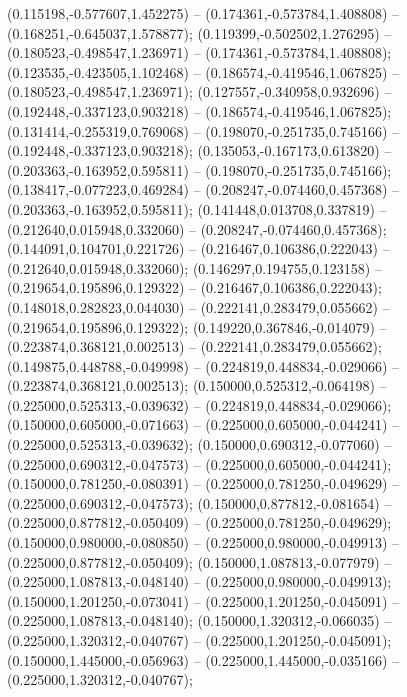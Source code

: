  (0.115198,-0.577607,1.452275) -- (0.174361,-0.573784,1.408808) -- (0.168251,-0.645037,1.578877);
 (0.119399,-0.502502,1.276295) -- (0.180523,-0.498547,1.236971) -- (0.174361,-0.573784,1.408808);
 (0.123535,-0.423505,1.102468) -- (0.186574,-0.419546,1.067825) -- (0.180523,-0.498547,1.236971);
 (0.127557,-0.340958,0.932696) -- (0.192448,-0.337123,0.903218) -- (0.186574,-0.419546,1.067825);
 (0.131414,-0.255319,0.769068) -- (0.198070,-0.251735,0.745166) -- (0.192448,-0.337123,0.903218);
 (0.135053,-0.167173,0.613820) -- (0.203363,-0.163952,0.595811) -- (0.198070,-0.251735,0.745166);
 (0.138417,-0.077223,0.469284) -- (0.208247,-0.074460,0.457368) -- (0.203363,-0.163952,0.595811);
 (0.141448,0.013708,0.337819) -- (0.212640,0.015948,0.332060) -- (0.208247,-0.074460,0.457368);
 (0.144091,0.104701,0.221726) -- (0.216467,0.106386,0.222043) -- (0.212640,0.015948,0.332060);
 (0.146297,0.194755,0.123158) -- (0.219654,0.195896,0.129322) -- (0.216467,0.106386,0.222043);
 (0.148018,0.282823,0.044030) -- (0.222141,0.283479,0.055662) -- (0.219654,0.195896,0.129322);
 (0.149220,0.367846,-0.014079) -- (0.223874,0.368121,0.002513) -- (0.222141,0.283479,0.055662);
 (0.149875,0.448788,-0.049998) -- (0.224819,0.448834,-0.029066) -- (0.223874,0.368121,0.002513);
 (0.150000,0.525312,-0.064198) -- (0.225000,0.525313,-0.039632) -- (0.224819,0.448834,-0.029066);
 (0.150000,0.605000,-0.071663) -- (0.225000,0.605000,-0.044241) -- (0.225000,0.525313,-0.039632);
 (0.150000,0.690312,-0.077060) -- (0.225000,0.690312,-0.047573) -- (0.225000,0.605000,-0.044241);
 (0.150000,0.781250,-0.080391) -- (0.225000,0.781250,-0.049629) -- (0.225000,0.690312,-0.047573);
 (0.150000,0.877812,-0.081654) -- (0.225000,0.877812,-0.050409) -- (0.225000,0.781250,-0.049629);
 (0.150000,0.980000,-0.080850) -- (0.225000,0.980000,-0.049913) -- (0.225000,0.877812,-0.050409);
 (0.150000,1.087813,-0.077979) -- (0.225000,1.087813,-0.048140) -- (0.225000,0.980000,-0.049913);
 (0.150000,1.201250,-0.073041) -- (0.225000,1.201250,-0.045091) -- (0.225000,1.087813,-0.048140);
 (0.150000,1.320312,-0.066035) -- (0.225000,1.320312,-0.040767) -- (0.225000,1.201250,-0.045091);
 (0.150000,1.445000,-0.056963) -- (0.225000,1.445000,-0.035166) -- (0.225000,1.320312,-0.040767);
